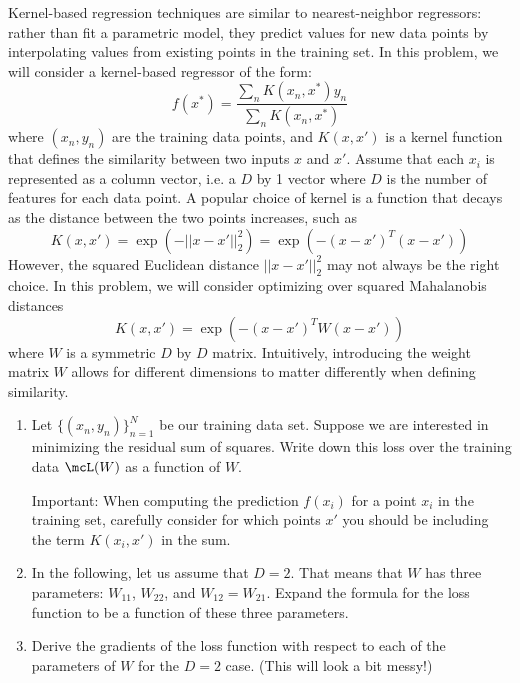 \documentclass[submit]{harvardml}
\begin{document}


\begin{problem}

Kernel-based regression techniques are similar to nearest-neighbor
regressors: rather than fit a parametric model, they predict values
for new data points by interpolating values from existing points in
the training set.  In this problem, we will consider a kernel-based
regressor of the form:
\begin{equation*}
  f(x^*) = \frac{ \sum_{n} K(x_n,x^*) y_n  }{ \sum_{n} K(x_n,x^*) }
\end{equation*}
where $(x_n,y_n)$ are the training data points, and $K(x,x')$ is a
kernel function that defines the similarity between two inputs $x$ and
$x'$. Assume that each $x_i$ is represented as a column vector, i.e. a
$D$ by 1 vector where $D$ is the number of features for each data
point. A popular choice of kernel is a function that decays as the
distance between the two points increases, such as
\begin{equation*}
  K(x,x') = \exp(-||x-x'||^2_2) = \exp(-(x-x')^T (x-x') )
\end{equation*}
However, the squared Euclidean distance $||x-x'||^2_2$ may not always
be the right choice.  In this problem, we will consider optimizing
over squared Mahalanobis distances
\begin{equation*}
  K(x,x') = \exp(-(x-x')^T W (x-x') )
  \label{eqn:distance}
\end{equation*}
where $W$ is a symmetric $D$ by $D$ matrix.  Intuitively, introducing
the weight matrix $W$ allows for different dimensions to matter
differently when defining similarity.

\begin{enumerate}

\item Let $\{(x_n,y_n)\}_{n=1}^N$ be our training data set.  Suppose
  we are interested in minimizing the residual sum of squares.  Write down this
  loss over the training data $\mcL(W)$ as a function of $W$.

  Important: When computing the prediction $f(x_i)$ for a point $x_i$
  in the training set, carefully consider for which points $x'$ you should be including
  the term $K(x_i,x')$ in the sum.

\item In the following, let us assume that $D = 2$.  That means that
  $W$ has three parameters: $W_{11}$, $W_{22}$, and $W_{12} = W_{21}$.
  Expand the formula for the loss function to be a function of these
  three parameters.

 \item Derive the gradients of the loss function with respect to each of the parameters of $W$ for the $D=2$ case. (This will look a bit messy!)



\end{enumerate}
\end{problem}
\end{document}
